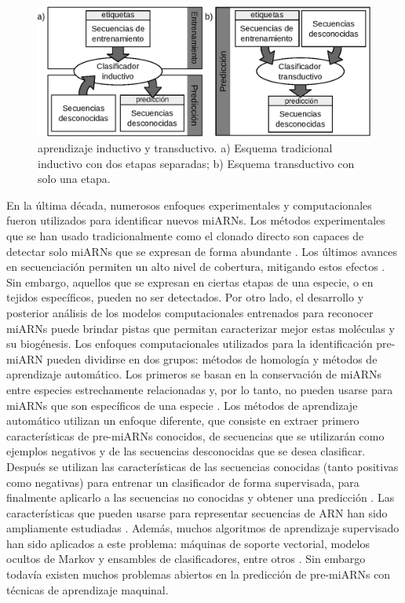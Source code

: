 \begin{figure}[tpb]
	\centering
	\includegraphics[width=\linewidth]{fig/paradigmas.eps}
	\caption[Aprendizaje inductivo vs. transductivo]{aprendizaje inductivo y transductivo. a) Esquema tradicional inductivo con dos etapas separadas; b) Esquema transductivo con solo una etapa.}
	\label{fig:schemes}
\end{figure}

En la última década, numerosos enfoques experimentales y computacionales fueron utilizados para identificar nuevos miARNs. Los métodos experimentales que se
han usado tradicionalmente como el clonado directo son capaces de detectar solo miARNs que se expresan de forma abundante \citep{kleftogiannis2013where}. Los
últimos avances en secuenciación permiten un alto nivel de cobertura, mitigando estos efectos \citep{an2013mirdeep}. Sin embargo, aquellos que se expresan en
ciertas etapas de una especie, o en tejidos específicos, pueden no ser detectados. Por otro lado, el desarrollo y posterior análisis de los modelos
computacionales entrenados para reconocer miARNs puede brindar pistas que permitan caracterizar mejor estas moléculas y su biogénesis. Los enfoques
computacionales utilizados para la identificación pre-miARN pueden dividirse en dos grupos: métodos de homología y métodos de aprendizaje automático. Los
primeros se basan en la conservación de miARNs entre especies estrechamente relacionadas y, por lo tanto, no pueden usarse para miARNs que son específicos de
una especie \citep{ng2007novo}. Los métodos de aprendizaje automático utilizan un enfoque diferente, que consiste en extraer primero características de
pre-miARNs conocidos, de secuencias que se utilizarán como ejemplos negativos y de las secuencias desconocidas que se desea clasificar. Después se utilizan
las características de las secuencias conocidas (tanto positivas como negativas) para entrenar un clasificador de forma supervisada, para finalmente aplicarlo
a las secuencias no conocidas y obtener una predicción \citep{kleftogiannis2013where}. Las características que pueden usarse para representar secuencias de
ARN han sido ampliamente estudiadas \citep{Lopes2014}. Además, muchos algoritmos de aprendizaje supervisado han sido aplicados a este problema: máquinas de
soporte vectorial, modelos ocultos de Markov y ensambles de clasificadores, entre otros \citep{kleftogiannis2013where}. Sin embargo todavía existen muchos
problemas abiertos en la predicción de pre-miARNs con técnicas de aprendizaje maquinal.

